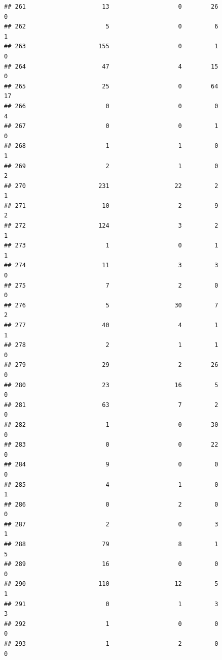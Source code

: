 \documentclass[
]{article}
\begin{document}
\begin{verbatim}
## 261                     13                   0        26                  0
## 262                      5                   0         6                  1
## 263                    155                   0         1                  0
## 264                     47                   4        15                  0
## 265                     25                   0        64                 17
## 266                      0                   0         0                  4
## 267                      0                   0         1                  0
## 268                      1                   1         0                  1
## 269                      2                   1         0                  2
## 270                    231                  22         2                  1
## 271                     10                   2         9                  2
## 272                    124                   3         2                  1
## 273                      1                   0         1                  1
## 274                     11                   3         3                  0
## 275                      7                   2         0                  0
## 276                      5                  30         7                  2
## 277                     40                   4         1                  1
## 278                      2                   1         1                  0
## 279                     29                   2        26                  0
## 280                     23                  16         5                  0
## 281                     63                   7         2                  0
## 282                      1                   0        30                  0
## 283                      0                   0        22                  0
## 284                      9                   0         0                  0
## 285                      4                   1         0                  1
## 286                      0                   2         0                  0
## 287                      2                   0         3                  1
## 288                     79                   8         1                  5
## 289                     16                   0         0                  0
## 290                    110                  12         5                  1
## 291                      0                   1         3                  3
## 292                      1                   0         0                  0
## 293                      1                   2         0                  0

\end{verbatim}
\end{document}
